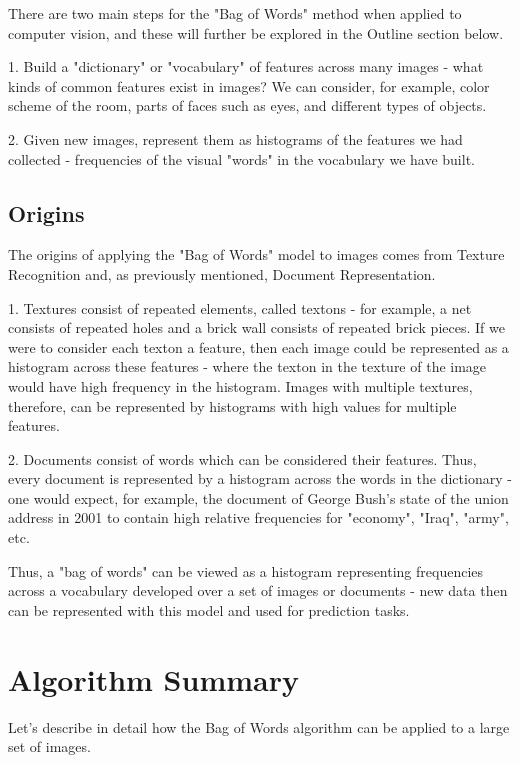 \documentclass{article}
\begin{document}
There are two main steps for the "Bag of Words" method when applied to computer vision, and these will further be explored in the Outline section below. 

1. Build a "dictionary" or "vocabulary" of features across many images - what kinds of common features exist in images? We can consider, for example, color scheme of the room, parts of faces such as eyes, and different types of objects.

2. Given new images, represent them as histograms of the features we had collected - frequencies of the visual "words" in the vocabulary we have built. 
\subsection{Origins}
The origins of applying the "Bag of Words" model to images comes from Texture Recognition and, as previously mentioned, Document Representation. 

1. Textures consist of repeated elements, called textons - for example, a net consists of repeated holes and a brick wall consists of repeated brick pieces. If we were to consider each texton a feature, then each image could be represented as a histogram across these features - where the texton in the texture of the image would have high frequency in the histogram. Images with multiple textures, therefore, can be represented by histograms with high values for multiple features.  

2. Documents consist of words which can be considered their features. Thus, every document is represented by a histogram across the words in the dictionary - one would expect, for example, the document of George Bush's state of the union address in 2001 to contain high relative frequencies for "economy", "Iraq", "army", etc. 

Thus, a "bag of words" can be viewed as a histogram representing frequencies across a vocabulary developed over a set of images or documents - new data then can be represented with this model and used for prediction tasks. 

\section{Algorithm Summary}
Let's describe in detail how the Bag of Words algorithm can be applied to a large set of images.
\end{document}
